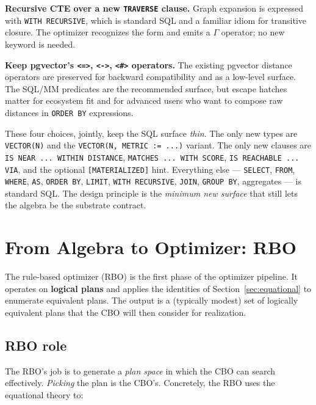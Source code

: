 \documentclass[sigconf,nonacm,review]{acmart}
\theoremstyle{plain}
\theoremstyle{definition}
\theoremstyle{remark}
\begin{document}
\textbf{Recursive CTE over a new \texttt{TRAVERSE} clause.}
Graph expansion is expressed with \texttt{WITH RECURSIVE},
which is standard SQL and a familiar idiom for transitive
closure. The optimizer recognizes the form and emits a
$\Gamma$ operator; no new keyword is needed.

\textbf{Keep pgvector's \texttt{<=>}, \texttt{<->}, \texttt{<\#>}
operators.} The existing pgvector distance operators are
preserved for backward compatibility and as a low-level
surface. The SQL/MM predicates are the recommended surface,
but escape hatches matter for ecosystem fit and for advanced
users who want to compose raw distances in \texttt{ORDER BY}
expressions.

These four choices, jointly, keep the SQL surface \emph{thin}.
The only new types are \texttt{VECTOR(N)} and the
\texttt{VECTOR(N, METRIC := ...)} variant. The only new
clauses are \texttt{IS NEAR ... WITHIN DISTANCE},
\texttt{MATCHES ... WITH SCORE}, \texttt{IS REACHABLE ... VIA},
and the optional \texttt{[MATERIALIZED]} hint. Everything else
--- \texttt{SELECT}, \texttt{FROM}, \texttt{WHERE}, \texttt{AS},
\texttt{ORDER BY}, \texttt{LIMIT}, \texttt{WITH RECURSIVE},
\texttt{JOIN}, \texttt{GROUP BY}, aggregates --- is standard
SQL. The design principle is the \emph{minimum new surface}
that still lets the algebra be the substrate contract.

\section{From Algebra to Optimizer: RBO}\label{sec:rbo}

The rule-based optimizer (RBO) is the first phase of the optimizer
pipeline. It operates on \textbf{logical plans} and applies the
identities of Section~\ref{sec:equational} to enumerate equivalent
plans. The output is a (typically modest) set of logically
equivalent plans that the CBO will then consider for realization.

\subsection{RBO role}\label{sec:rbo:role}

The RBO's job is to generate a \emph{plan space} in which the
CBO can search effectively. \emph{Picking} the plan is the CBO's.
Concretely, the RBO uses the equational theory to:
\end{document}
